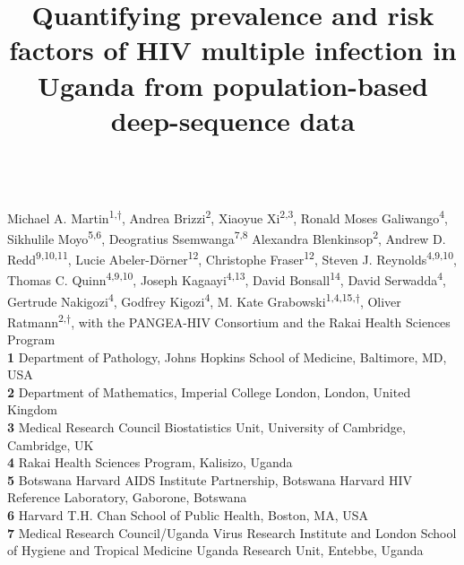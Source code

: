 \documentclass[10pt,letterpaper]{article}
\title{Quantifying prevalence and risk factors of HIV multiple infection in Uganda from population-based deep-sequence data}
\begin{document}

\begin{flushleft}

{\Large\textbf{} 
}
\newline
\\ 
Michael A. Martin\textsuperscript{1,$\dagger$},
Andrea Brizzi\textsuperscript{2},
Xiaoyue Xi\textsuperscript{2,3},
Ronald Moses Galiwango\textsuperscript{4},
Sikhulile Moyo\textsuperscript{5,6},
Deogratius Ssemwanga\textsuperscript{7,8}
Alexandra Blenkinsop\textsuperscript{2},
Andrew D. Redd\textsuperscript{9,10,11},
Lucie Abeler-Dörner\textsuperscript{12},
Christophe Fraser\textsuperscript{12},
Steven J. Reynolds\textsuperscript{4,9,10},
Thomas C. Quinn\textsuperscript{4,9,10},
Joseph Kagaayi\textsuperscript{4,13},
David Bonsall\textsuperscript{14},
David Serwadda\textsuperscript{4},
Gertrude Nakigozi\textsuperscript{4},
Godfrey Kigozi\textsuperscript{4},
M. Kate Grabowski\textsuperscript{1,4,15,$\dagger$},
Oliver Ratmann\textsuperscript{2,$\dagger$},
with the PANGEA-HIV Consortium and the Rakai Health Sciences Program
\\
\bigskip
\textbf{1} Department of Pathology, Johns Hopkins School of Medicine, Baltimore, MD, USA
\\
\textbf{2} Department of Mathematics, Imperial College London, London, United Kingdom
\\
\textbf{3} Medical Research Council Biostatistics Unit, University of Cambridge, Cambridge, UK \\

\textbf{4} Rakai Health Sciences Program, Kalisizo, Uganda \\

\textbf{5} Botswana Harvard AIDS Institute Partnership, Botswana Harvard HIV Reference Laboratory, Gaborone, Botswana \\

\textbf{6} Harvard T.H. Chan School of Public Health, Boston, MA, USA \\

\textbf{7} Medical Research Council/Uganda Virus Research Institute and London School of Hygiene and Tropical Medicine Uganda Research Unit, Entebbe, Uganda \\


\end{flushleft}
\end{document}
